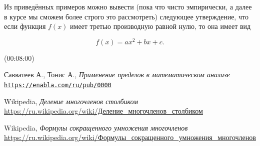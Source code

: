 \documentclass[12pt]{article}
\begin{document}
Из приведённых примеров можно вывести (пока что чисто эмпирически, а далее в курсе мы сможем более строго это рассмотреть) следующее утверждение, что если функция $f(x)$ имеет третью производную равной нулю, то она имеет вид 

\begin{equation}
	f(x)=ax^2+bx+c.
\end{equation}

(00:08:00)

\begin{thebibliography}{9}
	Савватеев А., Тонис А., \textit{Применение пределов в математическом анализе}
	\\\texttt{\url{https://enabla.com/ru/pub/0000}}
	
	Wikipedia, \textit{Деление многочленов столбиком}
	\\\href{https://ru.wikipedia.org/wiki/\%D0\%94\%D0\%B5\%D0\%BB\%D0\%B5\%D0\%BD\%D0\%B8\%D0\%B5_\%D0\%BC\%D0\%BD\%D0\%BE\%D0\%B3\%D0\%BE\%D1\%87\%D0\%BB\%D0\%B5\%D0\%BD\%D0\%BE\%D0\%B2_\%D1\%81\%D1\%82\%D0\%BE\%D0\%BB\%D0\%B1\%D0\%B8\%D0\%BA\%D0\%BE\%D0\%BC}{https://ru.wikipedia.org/wiki/Деление\_многочленов\_столбиком}

	Wikipedia, \textit{Формулы сокращенного умножения многочленов}
	\\\href{https://ru.wikipedia.org/wiki/\%D0\%A4\%D0\%BE\%D1\%80\%D0\%BC\%D1\%83\%D0\%BB\%D1\%8B\_\%D1\%81\%D0\%BE\%D0\%BA\%D1\%80\%D0\%B0\%D1\%89\%D1\%91\%D0\%BD\%D0\%BD\%D0\%BE\%D0\%B3\%D0\%BE\_\%D1\%83\%D0\%BC\%D0\%BD\%D0\%BE\%D0\%B6\%D0\%B5\%D0\%BD\%D0\%B8\%D1\%8F\_\%D0\%BC\%D0\%BD\%D0\%BE\%D0\%B3\%D0\%BE\%D1\%87\%D0\%BB\%D0\%B5\%D0\%BD\%D0\%BE\%D0\%B2}{https://ru.wikipedia.org/wiki/Формулы\_сокращенного\_умножения\_многочленов}

\end{thebibliography}
\end{document}
